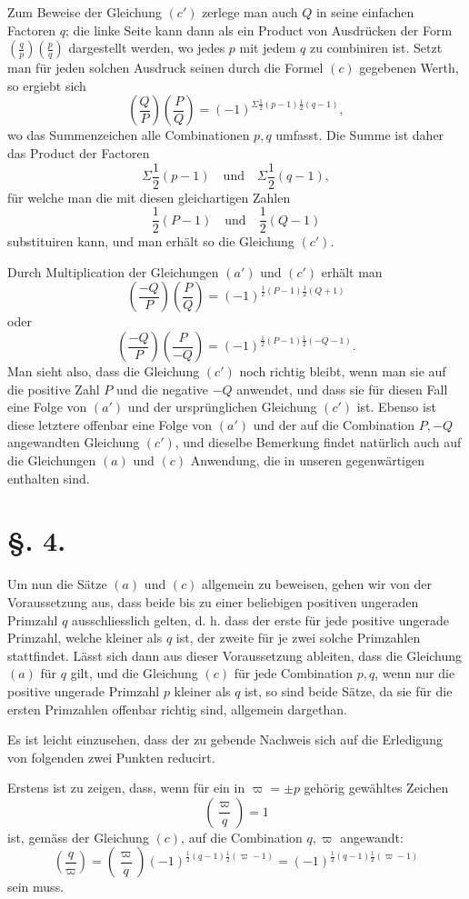 \documentclass[11pt]{article}
\newcommand{\J}[2]{\left(\frac{#1}{#2}\right)}
\begin{document}
Zum Beweise der Gleichung $(c')$ zerlege man auch $Q$ in seine einfachen Factoren $q$; die linke Seite kann dann als ein Product von Ausdrücken der Form $\J{q}{p}\J{p}{q}$ dargestellt werden, wo jedes $p$ mit jedem $q$ zu combiniren ist. Setzt man für jeden solchen Ausdruck seinen durch die Formel $(c)$ gegebenen Werth, so ergiebt sich
\[
 \J{Q}{P}\J{P}{Q}=(-1)^{\Sigma\frac12(p-1)\frac12(q-1)},
\]
wo das Summenzeichen alle Combinationen $p,q$ umfasst. Die Summe ist daher das Product der Factoren
\[
 \Sigma\frac12(p-1)\quad\text{und}\quad \Sigma\frac12(q-1),
\]
für welche man die mit diesen gleichartigen Zahlen
\[
 \frac12(P-1)\quad\text{und}\quad \frac12(Q-1)
\]
substituiren kann, und man erhält so die Gleichung $(c')$.

Durch Multiplication der Gleichungen $(a')$ und $(c')$ erhält man
\[
 \J{-Q}{P}\J{P}{Q}=(-1)^{\frac12(P-1)\frac12(Q+1)}
\]
oder
\[
 \J{-Q}{P}\J{P}{-Q}=(-1)^{\frac12(P-1)\frac12(-Q-1)}.
\]
Man sieht also, dass die Gleichung $(c')$ noch richtig bleibt, wenn man sie auf die positive Zahl $P$ und die negative $-Q$ anwendet, und dass sie für diesen Fall eine Folge von $(a')$ und der ursprünglichen Gleichung $(c')$ ist. Ebenso ist diese letztere offenbar eine Folge von $(a')$ und der auf die Combination $P,-Q$ angewandten Gleichung $(c')$, und dieselbe Bemerkung findet natürlich auch auf die Gleichungen $(a)$ und $(c)$ Anwendung, die in unseren gegenwärtigen enthalten sind.

\section*{\S. 4.}

Um nun die Sätze $(a)$ und $(c)$ allgemein zu beweisen, gehen wir von der Voraussetzung aus, dass beide bis zu einer beliebigen positiven ungeraden Primzahl $q$ ausschliesslich gelten, d. h. dass der erste für jede positive ungerade Primzahl, welche kleiner als $q$ ist, der zweite für je zwei solche Primzahlen stattfindet. Lässt sich dann aus dieser Voraussetzung ableiten, dass die Gleichung $(a)$ für $q$ gilt, und die Gleichung $(c)$ für jede Combination $p,q$, wenn nur die positive ungerade Primzahl $p$ kleiner als $q$ ist, so sind beide Sätze, da sie für die ersten Primzahlen offenbar richtig sind, allgemein dargethan.

Es ist leicht einzusehen, dass der zu gebende Nachweis sich auf die Erledigung von folgenden zwei Punkten reducirt.

Erstens ist zu zeigen, dass, wenn für ein in $\varpi=\pm p$ gehörig gewähltes Zeichen
\[
 \J{\varpi}{q}=1
\]
ist, gemäss der Gleichung $(c)$, auf die Combination $q,\varpi$ angewandt:
\[
 \J{q}{\varpi}=\J{\varpi}{q}(-1)^{\frac12(q-1)\frac12(\varpi-1)}=(-1)^{\frac12(q-1)\frac12(\varpi-1)}
\]
sein muss.
\end{document}
